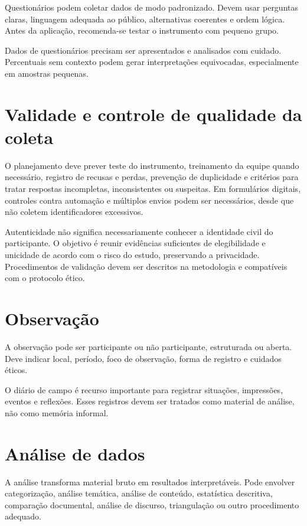 Questionários podem coletar dados de modo padronizado. Devem usar perguntas claras, linguagem adequada ao público, alternativas coerentes e ordem lógica. Antes da aplicação, recomenda-se testar o instrumento com pequeno grupo.

Dados de questionários precisam ser apresentados e analisados com cuidado. Percentuais sem contexto podem gerar interpretações equivocadas, especialmente em amostras pequenas.

\section{Validade e controle de qualidade da coleta}

O planejamento deve prever teste do instrumento, treinamento da equipe quando necessário, registro de recusas e perdas, prevenção de duplicidade e critérios para tratar respostas incompletas, inconsistentes ou suspeitas. Em formulários digitais, controles contra automação e múltiplos envios podem ser necessários, desde que não coletem identificadores excessivos.

Autenticidade não significa necessariamente conhecer a identidade civil do participante. O objetivo é reunir evidências suficientes de elegibilidade e unicidade de acordo com o risco do estudo, preservando a privacidade. Procedimentos de validação devem ser descritos na metodologia e compatíveis com o protocolo ético.

\section{Observação}

A observação pode ser participante ou não participante, estruturada ou aberta. Deve indicar local, período, foco de observação, forma de registro e cuidados éticos.

O diário de campo é recurso importante para registrar situações, impressões, eventos e reflexões. Esses registros devem ser tratados como material de análise, não como memória informal.

\section{Análise de dados}

A análise transforma material bruto em resultados interpretáveis. Pode envolver categorização, análise temática, análise de conteúdo, estatística descritiva, comparação documental, análise de discurso, triangulação ou outro procedimento adequado.

